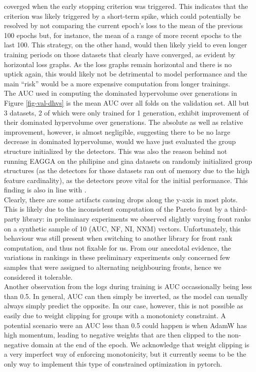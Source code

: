 \documentclass[twoside,11pt]{article}
\begin{document}
coverged when the early stopping criterion was triggered.
This indicates that the criterion was likely triggered by a short-term spike, which could potentially be resolved by not comparing the current epoch's loss
to the mean of the previous 100 epochs but, for instance, the mean of a range of more recent epochs to the last 100.
This strategy, on the other hand, would then likely yield to even longer training periods on those datasets that clearly have converged, as evident by
horizontal loss graphs.
As the loss graphs remain horizontal and there is no uptick again, this would likely not be detrimental to model performance and the main ``risk'' would be
a more expensive computation from longer trainings.
\\
The AUC used in computing the dominated hypervolume over generations in Figure \ref{fig-val-dhvs} is the mean AUC over all folds on the validation set.
All but 3 datasets, 2 of which were only trained for 1 generation, exhibit improvement of their dominated hypervolume over generations. The absolute as
well as relative improvement, however, is almost negligible, suggesting there to be no large decrease in dominated hypervolume, would we have just evaluated
the group structure initialized by the detectors.
This was also the reason behind not running EAGGA on the philipine and gina datasets on randomly initialized group structures (as the detectors for those datasets
ran out of memory due to the high feature cardinality), as the detectors prove vital for the initial performance. This finding is also in
line with \citep[Fig. 4, p. 545]{EAGGA}.
\\
Clearly, there are some artifacts causing drops along the y-axis in most plots. This is likely due to the inconsistent computation of the Pareto front
by a third-party library: in preliminary experiments we observed slightly varying front ranks on a synthetic sample of 10 (AUC, NF, NI, NNM) vectors.
Unfortunately, this behaviour was still present when switching to another library for front rank computation, and thus not fixable for us.
From our anecdotal evidence, the variations in rankings in these preliminary experiments only concerned few samples that were assigned to alternating
neighbouring fronts, hence we considered it tolerable.
\\
Another observation from the logs during training is AUC occassionally being less than 0.5.
In general, AUC can then simply be inverted, as the model can usually always simply predict the opposite.
In our case, however, this is not possible as easily due to weight clipping for groups with a monotonicty constraint.
A potential scenario were an AUC less than 0.5 could happen is when AdamW has high momentum, leading to negative weights that are then clipped to the
non-negative domain at the end of the epoch.
We acknowledge that weight clipping is a very imperfect way of enforcing monotonicity, but it currently seems to be the only way to implement this type of
constrained optimization in pytorch.
\end{document}
